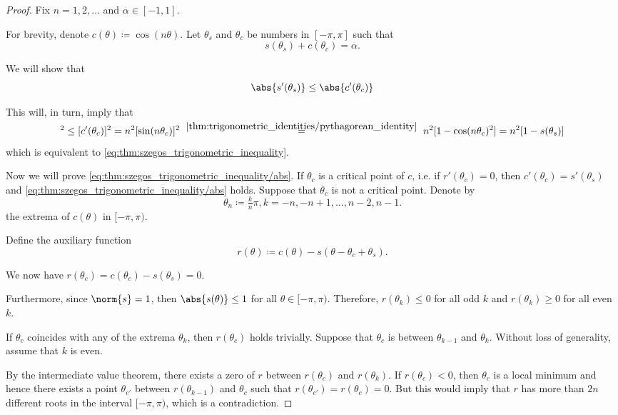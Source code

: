 \begin{proof}
  Fix \( n = 1, 2, \ldots \) and \( \alpha \in [-1, 1] \).

  For brevity, denote \( c(\theta) \coloneqq \cos(n \theta) \). Let \( \theta_s \) and \( \theta_c \) be numbers in \( [-\pi, \pi] \) such that
  \begin{equation*}
    s(\theta_s) + c(\theta_c) = \alpha.
  \end{equation*}

  We will show that
  \begin{equation}\label{eq:thm:szegos_trigonometric_inequality/abs}
    \abs{s'(\theta_s)} \leq \abs{c'(\theta_c)}
  \end{equation}

  This will, in turn, imply that
  \begin{equation*}
    [s'(\theta_s)]^2
    \leq
    [c'(\theta_c)]^2
    =
    n^2 [\sin(n \theta_c)]^2
    \reloset {\ref{thm:trigonometric_identities/pythagorean_identity}}
    =
    n^2 [1 - \cos(n \theta_c)^2]
    =
    n^2 [1 - s(\theta_s)]
  \end{equation*}
  which is equivalent to \eqref{eq:thm:szegos_trigonometric_inequality}.

  Now we will prove \eqref{eq:thm:szegos_trigonometric_inequality/abs}. If \( \theta_c \) is a critical point of \( c \), i.e. if \( r'(\theta_c) = 0 \), then \( c'(\theta_c) = s'(\theta_s) \) and \eqref{eq:thm:szegos_trigonometric_inequality/abs} holds. Suppose that \( \theta_c \) is not a critical point. Denote by
  \begin{equation*}
    \theta_n \coloneqq \tfrac k n \pi, k = -n, -n+1, \ldots, n-2, n-1.
  \end{equation*}
  the extrema of \( c(\theta) \) in \( [-\pi, \pi) \).

  Define the auxiliary function
  \begin{equation*}
    r(\theta) \coloneqq c(\theta) - s(\theta - \theta_c + \theta_s).
  \end{equation*}

  We now have \( r(\theta_c) = c(\theta_c) - s(\theta_s) = 0 \).

  Furthermore, since \( \norm{s} = 1 \), then \( \abs{s(\theta)} \leq 1 \) for all \( \theta \in [-\pi, \pi) \). Therefore, \( r(\theta_k) \leq 0 \) for all odd \( k \) and \( r(\theta_k) \geq 0 \) for all even \( k \).

  If \( \theta_c \) coincides with any of the extrema \( \theta_k \), then \( r(\theta_c) \) holds trivially. Suppose that \( \theta_c \) is between \( \theta_{k-1} \) and \( \theta_k \). Without loss of generality, assume that \( k \) is even.

  By the intermediate value theorem, there exists a zero of \( r \) between \( r(\theta_c) \) and \( r(\theta_k) \). If \( r(\theta_c) < 0 \), then \( \theta_c \) is a local minimum and hence there exists a point \( \theta_{c'} \) between \( r(\theta_{k-1}) \) and \( \theta_c \) such that \( r(\theta_{c'}) = r(\theta_c) = 0 \). But this would imply that \( r \) has more than \( 2n \) different roots in the interval \( [-\pi, \pi) \), which is a contradiction.
\end{proof}

